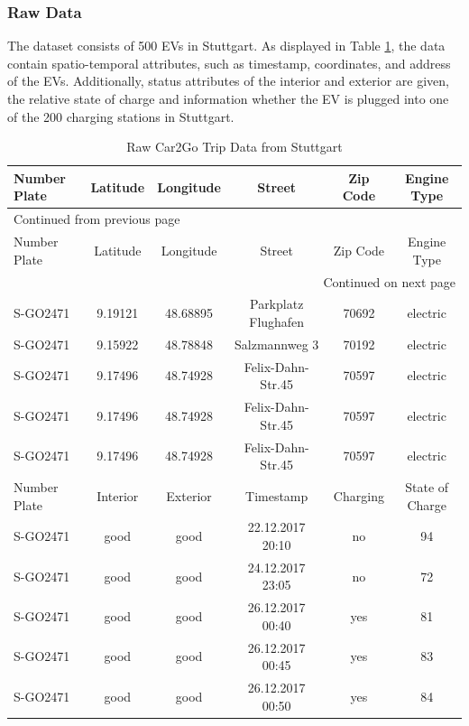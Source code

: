 \documentclass[a4paper, twoside, 12pt]{article}
\begin{document}
\subsubsection{Raw Data}
\label{sec:orgd25ef44}
The dataset consists of 500 EVs in Stuttgart. As displayed in Table
\ref{car2go-sample-data}, the data contain spatio-temporal attributes, such as
timestamp, coordinates, and address of the EVs. Additionally, status attributes
of the interior and exterior are given, the relative state of charge and
information whether the EV is plugged into one of the 200 charging stations in
Stuttgart.

\begin{longtable}{l|ccccc}
\caption{Raw Car2Go Trip Data from Stuttgart \label{car2go-sample-data}}
\\
\hline
\hline
Number Plate & Latitude & Longitude & Street & Zip Code & Engine Type\\
\hline
\endfirsthead
\multicolumn{6}{l}{Continued from previous page} \\
\hline

Number Plate & Latitude & Longitude & Street & Zip Code & Engine Type \\

\hline
\endhead
\hline\multicolumn{6}{r}{Continued on next page} \\
\endfoot
\endlastfoot
\hline
S-GO2471 & 9.19121 & 48.68895 & Parkplatz Flughafen & 70692 & electric\\
S-GO2471 & 9.15922 & 48.78848 & Salzmannweg 3 & 70192 & electric\\
S-GO2471 & 9.17496 & 48.74928 & Felix-Dahn-Str.45 & 70597 & electric\\
S-GO2471 & 9.17496 & 48.74928 & Felix-Dahn-Str.45 & 70597 & electric\\
S-GO2471 & 9.17496 & 48.74928 & Felix-Dahn-Str.45 & 70597 & electric\\
\hline
Number Plate & Interior & Exterior & Timestamp & Charging & State of Charge\\
\hline
S-GO2471 & good & good & 22.12.2017 20:10 & no & 94\\
S-GO2471 & good & good & 24.12.2017 23:05 & no & 72\\
S-GO2471 & good & good & 26.12.2017 00:40 & yes & 81\\
S-GO2471 & good & good & 26.12.2017 00:45 & yes & 83\\
S-GO2471 & good & good & 26.12.2017 00:50 & yes & 84\\
\hline
\hline
\end{longtable}
\end{document}
